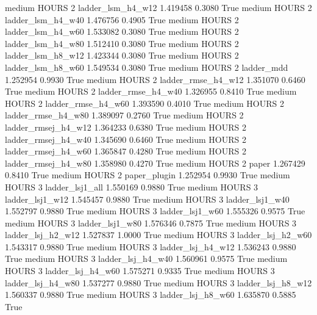     medium    HOURS                 2   ladder_lsm_h4_w12   1.419458      0.3080    True
    medium    HOURS                 2   ladder_lsm_h4_w40   1.476756      0.4905    True
    medium    HOURS                 2   ladder_lsm_h4_w60   1.533082      0.3080    True
    medium    HOURS                 2   ladder_lsm_h4_w80   1.512410      0.3080    True
    medium    HOURS                 2   ladder_lsm_h8_w12   1.423344      0.3080    True
    medium    HOURS                 2   ladder_lsm_h8_w60   1.549534      0.3080    True
    medium    HOURS                 2          ladder_mdd   1.252954      0.9930    True
    medium    HOURS                 2  ladder_rmse_h4_w12   1.351070      0.6460    True
    medium    HOURS                 2  ladder_rmse_h4_w40   1.326955      0.8410    True
    medium    HOURS                 2  ladder_rmse_h4_w60   1.393590      0.4010    True
    medium    HOURS                 2  ladder_rmse_h4_w80   1.389097      0.2760    True
    medium    HOURS                 2 ladder_rmsej_h4_w12   1.364233      0.6380    True
    medium    HOURS                 2 ladder_rmsej_h4_w40   1.345690      0.6460    True
    medium    HOURS                 2 ladder_rmsej_h4_w60   1.365847      0.4280    True
    medium    HOURS                 2 ladder_rmsej_h4_w80   1.358980      0.4270    True
    medium    HOURS                 2               paper   1.267429      0.8410    True
    medium    HOURS                 2        paper_plugin   1.252954      0.9930    True
    medium    HOURS                 3     ladder_lsj1_all   1.550169      0.9880    True
    medium    HOURS                 3     ladder_lsj1_w12   1.545457      0.9880    True
    medium    HOURS                 3     ladder_lsj1_w40   1.552797      0.9880    True
    medium    HOURS                 3     ladder_lsj1_w60   1.555326      0.9575    True
    medium    HOURS                 3     ladder_lsj1_w80   1.576346      0.7875    True
    medium    HOURS                 3   ladder_lsj_h2_w12   1.527837      1.0000    True
    medium    HOURS                 3   ladder_lsj_h2_w60   1.543317      0.9880    True
    medium    HOURS                 3   ladder_lsj_h4_w12   1.536243      0.9880    True
    medium    HOURS                 3   ladder_lsj_h4_w40   1.560961      0.9575    True
    medium    HOURS                 3   ladder_lsj_h4_w60   1.575271      0.9335    True
    medium    HOURS                 3   ladder_lsj_h4_w80   1.537277      0.9880    True
    medium    HOURS                 3   ladder_lsj_h8_w12   1.560337      0.9880    True
    medium    HOURS                 3   ladder_lsj_h8_w60   1.635870      0.5885    True
